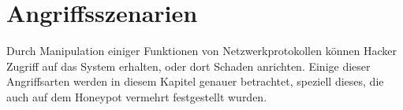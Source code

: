 \section{Angriffsszenarien}
Durch Manipulation einiger Funktionen von Netzwerkprotokollen können Hacker Zugriff auf das System erhalten, oder dort Schaden anrichten. Einige dieser Angriffsarten werden in diesem Kapitel genauer betrachtet, speziell dieses, die auch auf dem Honeypot vermehrt festgestellt wurden.

